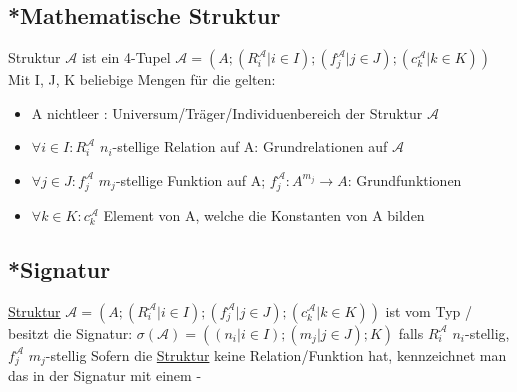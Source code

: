 \documentclass[12pt,a4paper]{article} %
\begin{document}
	\subsection{*Mathematische Struktur}
	\label{Struktur}
	Struktur $\mathcal{A}$ ist ein 4-Tupel $\mathcal{A} = (A; (R_i^{\mathcal{A}} | i \in I); (f_j^{\mathcal{A}} | j \in J); (c_k^{\mathcal{A}} | k \in K))$ \newline 
	Mit I, J, K beliebige Mengen für die gelten:
	\begin{itemize}
		\item A nichtleer : Universum/Träger/Individuenbereich der Struktur $\mathcal{A}$
		\item $\forall i \in I: R_i^{\mathcal{A}}$ $n_i$-stellige Relation auf A: Grundrelationen auf $\mathcal{A}$
		\item $\forall j \in J: f_j^{\mathcal{A}}$ $m_j$-stellige Funktion auf A; $f_j^{\mathcal{A}}: A^{m_j} \rightarrow A$: Grundfunktionen 
		\item $\forall k \in K: c_k^{\mathcal{A}}$ Element von A, welche die Konstanten von A bilden
	\end{itemize}

	\subsection{*Signatur}
	\label{Signatur}
	\hyperref[Struktur]{Struktur} $\mathcal{A} = (A; (R_i^{\mathcal{A}} | i \in I); (f_j^{\mathcal{A}} | j \in J); (c_k^{\mathcal{A}} | k \in K))$ ist vom Typ / besitzt die Signatur: $\sigma (\mathcal{A}) = ((n_i | i \in I); (m_j | j \in J); K)$ \newline
	falls $R_i^{\mathcal{A}}$ $n_i$-stellig, $f_j^{\mathcal{A}}$ $m_j$-stellig\newline 
	Sofern die \hyperref[Struktur]{Struktur} keine Relation/Funktion hat, kennzeichnet man das in der Signatur mit einem -
	
\end{document}
